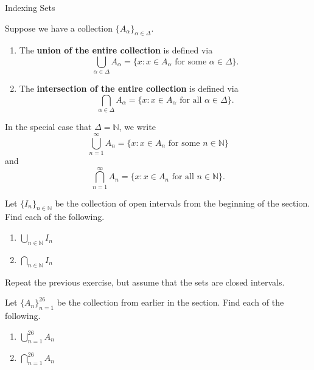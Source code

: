 \begin{section}{Indexing Sets}
\begin{example}
\begin{enumerate}
\end{enumerate}
\end{example}

\begin{definition}
Suppose we have a collection $\{A_{\alpha}\}_{\alpha\in\Delta}$.

\begin{enumerate}
\item The \textbf{union of the entire collection} is defined via
\[
\bigcup_{\alpha\in\Delta} A_{\alpha}=\{x:x\in A_{\alpha} \mbox{ for some }\alpha\in \Delta\}.
\]

\item The \textbf{intersection of the entire collection} is defined via
\[
\bigcap_{\alpha\in\Delta} A_{\alpha}=\{x:x\in A_{\alpha} \mbox{ for all }\alpha\in \Delta\}.
\]

\end{enumerate}
\end{definition}

\begin{remark} 
In the special case that $\Delta=\mathbb{N}$, we write
\[
\bigcup_{n=1}^{\infty}A_n= \{ x : x \in A_n \mbox{ for some } n \in \mathbb{N}\}
\] 
and
\[
\bigcap_{n=1}^{\infty}A_n= \{ x : x \in A_n \mbox{ for all } n \in \mathbb{N}\}.
\] 
\end{remark}

\begin{exercise}
Let $\{I_n\}_{n\in\mathbb{N}}$ be the collection of open intervals from the beginning of the section.  Find each of the following.
\begin{enumerate}
\item $\displaystyle \bigcup_{n\in\mathbb{N}}I_n$
\item $\displaystyle \bigcap_{n\in\mathbb{N}}I_n$
\end{enumerate}
\end{exercise}

\begin{exercise}
Repeat the previous exercise, but assume that the sets are closed intervals.
\end{exercise}

\begin{exercise}
Let $\{A_n\}_{n=1}^{26}$ be the collection from earlier in the section.  Find each of the following.
\begin{enumerate}
\item $\displaystyle \bigcup_{n=1}^{26}A_n$
\item $\displaystyle \bigcap_{n=1}^{26}A_n$
\end{enumerate}
\end{exercise}


\end{section}
